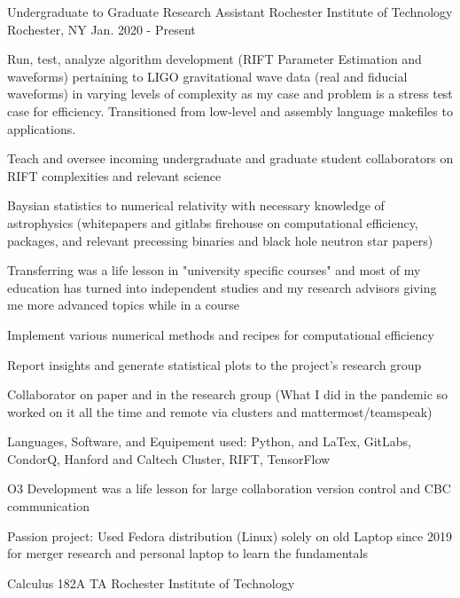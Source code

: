 \begin{cventries}

    \cventry
    {Undergraduate to Graduate Research Assistant}
    {Rochester Institute of Technology}
    {Rochester, NY}
    {Jan. 2020 - Present}
    {
      \begin{cvitems}
        \item {Run, test, analyze algorithm development (RIFT Parameter Estimation and waveforms) pertaining to LIGO gravitational wave data (real and fiducial waveforms) in varying levels of complexity as my case and problem is a stress test case for efficiency. Transitioned from low-level and assembly language makefiles to applications.}
        \item{Teach and oversee incoming undergraduate and graduate student collaborators on RIFT complexities and relevant science}
        \item{Baysian statistics to numerical relativity with necessary knowledge of astrophysics (whitepapers and gitlabs firehouse on computational efficiency, packages, and relevant precessing binaries and black hole neutron star papers)}
        \item{Transferring was a life lesson in "university specific courses" and most of my education has turned into independent studies and my research advisors giving me more advanced topics while in a course}
        \item{Implement various numerical methods and recipes for  computational efficiency}
        \item {Report insights and generate statistical plots to the project's research group}
        \item {Collaborator on paper and in the research group (What I did in the pandemic so worked on it all the time and remote via clusters and mattermost/teamspeak)}
        \item {Languages, Software, and Equipement used: Python, and LaTex, GitLabs, CondorQ, Hanford and Caltech Cluster, RIFT, TensorFlow}
        \item{O3 Development was a life lesson for large collaboration version control and CBC communication}
        \item{Passion project: Used Fedora distribution (Linux) solely on old Laptop since 2019 for merger research and personal laptop to learn the fundamentals}
      \end{cvitems}
    }
    \cventry
    {Calculus 182A TA}
    {Rochester Institute of Technology}

\end{cventries}
